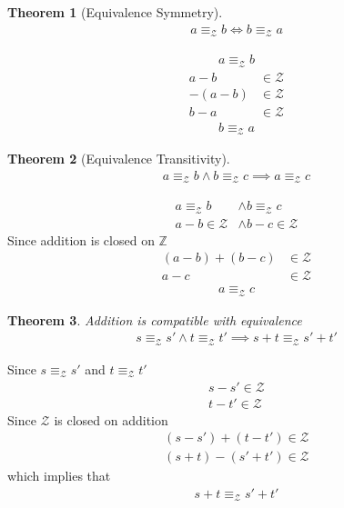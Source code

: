 \documentclass{amsart}
\numberwithin{equation}{section}
\let\oldendproof\endproof
\renewenvironment{proof}[1][\proofname]{%
  \setcounter{case}{0}
  \setcounter{step}{0}
  \oldproof[#1]%
}{\oldendproof}
\theoremstyle{plain}
\newtheorem{theorem}{Theorem}[section]
\theoremstyle{definition}
\theoremstyle{remark}
\begin{document}
\begin{theorem}[Equivalence Symmetry]
  \begin{align}
    a\equiv_\mathcal{Z} b \iff b\equiv_\mathcal{Z} a
  \end{align}
\end{theorem}
\begin{proof}
  \begin{align}
    a\equiv_\mathcal{Z} b
  \end{align}
  \begin{align}
    a-b&\in\mathcal{Z}\\
    -(a-b) &\in\mathcal{Z}\\
    b-a &\in\mathcal{Z}
  \end{align}
  \begin{align}
    b\equiv_\mathcal{Z} a
  \end{align}
\end{proof}

\begin{theorem}[Equivalence Transitivity]
  \begin{align}
    a\equiv_\mathcal{Z} b \land b \equiv_\mathcal{Z} c \implies a\equiv_\mathcal{Z} c
  \end{align}
\end{theorem}
\begin{proof}
  \begin{align}
    a\equiv_\mathcal{Z} b &\land b \equiv_\mathcal{Z} c\\
    a-b\in\mathcal{Z} &\land b-c \in\mathcal{Z}
  \end{align}
  Since addition is closed on $\mathbb{Z}$
  \begin{align}
    (a-b) + (b-c) &\in\mathcal{Z}\\
    a-c &\in\mathcal{Z}
  \end{align}
  \begin{align}
    a\equiv_\mathcal{Z} c
  \end{align}
\end{proof}

\begin{theorem}
  Addition is compatible with equivalence
  \begin{align}
    s\equiv_\mathcal{Z} s' \land t\equiv_\mathcal{Z} t' \implies s+t \equiv_\mathcal{Z} s'+t'
  \end{align}
\end{theorem}
\begin{proof}
  Since $s\equiv_\mathcal{Z} s'$ and $t\equiv_\mathcal{Z} t'$
  \begin{align}
    s-s'\in\mathcal{Z}\\
    t-t'\in\mathcal{Z}
  \end{align}
  Since $\mathcal{Z}$ is closed on addition
  \begin{align}
    (s-s')+(t-t')\in\mathcal{Z}\\
    (s+t)-(s'+t') \in\mathcal{Z}
  \end{align}
  which implies that
  \begin{align}
    s+t \equiv_\mathcal{Z} s'+t'
  \end{align}
\end{proof}
\end{document}
